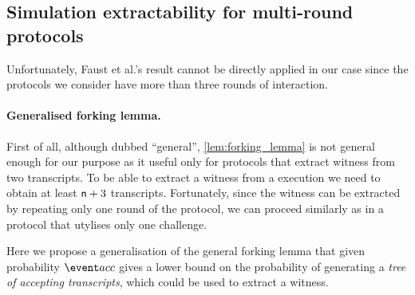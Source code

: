 \documentclass[runningheads,11pt]{llncs}
\theoremstyle{definition}
\begin{document}
\subsection{Simulation extractability for multi-round protocols}
Unfortunately, Faust et al.'s result cannot be directly applied in our case since the protocols we consider have more than three rounds of interaction.

\paragraph{Generalised forking lemma.}
First of all, although dubbed ``general'', \cref{lem:forking_lemma} is not general enough for our purpose as it useful only for protocols that extract witness from two transcripts. 
To be able to extract a witness from a \plonk{} execution we need to obtain at least $\mathsf{n} + 3$ transcripts.
Fortunately, since the witness can be extracted by repeating only one round of the protocol, we can proceed similarly as in a protocol that utylises only one challenge.

Here we propose a generalisation of the general forking lemma that given probability $\accProb$ gives a lower bound on the probability of generating a \emph{tree of accepting transcripts}, which could be used to extract a witness. 
\end{document}
